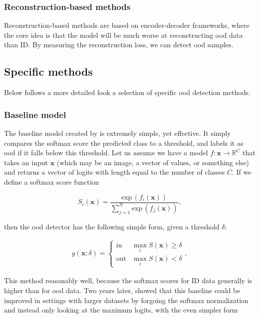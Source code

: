 \documentclass[UKenglish]{uiomasterthesis} %
\newcommand{\R}{\mathbb{R}}
\theoremstyle{definition}
\begin{document}
\subsubsection{Reconstruction-based methods}

Reconstruction-based methods are based on encoder-decoder frameworks, where the core idea is that the model will be much worse at reconstructing \ac{ood} data than ID. By measuring the reconstruction loss, we can detect \ac{ood} samples.
\\

\subsection{Specific methods} \label{ood_specific}

Below follows a more detailed look a selection of specific \ac{ood} detection methods.

\subsubsection{Baseline model} \label{ood_baseline}

The baseline model created by \cite{oodbaseline} is extremely simple, yet effective. It simply compares the softmax score the predicted class to a threshold, and labels it as \ac{ood} if it falls below this threshold. Let us assume we have a model $f: \bm{x} \rightarrow \R^C$ that takes an input $\bm{x}$ (which may be an image, a vector of values, or something else) and returns a vector of logits with length equal to the number of classes $C$. If we define a softmax score function 

\begin{equation}
    S_i(\bm{x}) = \frac{\text{exp} \, (f_i(\bm{x}))}{\sum^N_{j=1} \text{exp} \, (f_j(\bm{x}))},
\label{softmax}
\end{equation}

then the \ac{ood} detector has the following simple form, given a threshold $\delta$:

\begin{align}
\label{eq:msp}
    g(\bm{x}; \delta)=\begin{cases} 
        \text{in } & \max_i S(\bm{x})\ge \delta \\
        \text{out} & \max_i S(\bm{x}) < \delta 
   \end{cases},
\end{align}

This method reasonably well, because the softmax scores for ID data generally is higher than for \ac{ood} data. Two years later, \cite{mls} showed that this baseline could be improved in settings with larger datasets by forgoing the softmax normalization and instead only looking at the maximum logits, with the even simpler form
\end{document}
